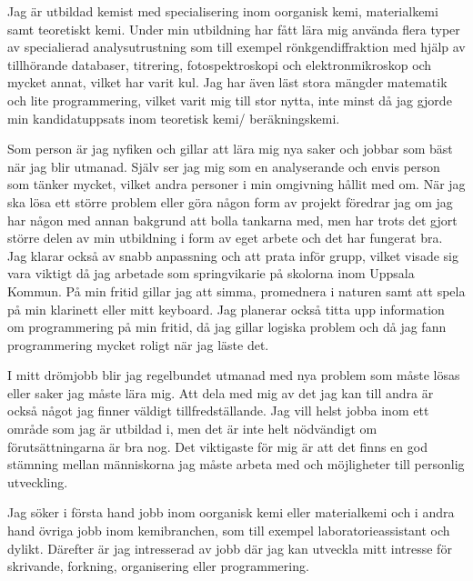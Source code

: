 Jag är utbildad kemist med specialisering inom oorganisk kemi, materialkemi samt teoretiskt kemi. Under min utbildning har  fått lära mig använda flera typer av specialierad analysutrustning som till exempel rönkgendiffraktion med hjälp av tillhörande databaser, titrering, fotospektroskopi och elektronmikroskop och mycket annat, vilket har varit kul. Jag har även läst stora mängder matematik och lite programmering, vilket varit mig till stor nytta, inte minst då  jag gjorde min kandidatuppsats inom teoretisk kemi/ beräkningskemi.


Som person är jag nyfiken och gillar att lära mig nya saker och jobbar som bäst när jag blir utmanad. Själv ser jag mig som en analyserande och envis person som tänker mycket, vilket andra personer i min omgivning hållit med om. När jag ska lösa ett större  problem eller göra någon form av projekt föredrar jag om jag  har någon med annan bakgrund att bolla tankarna med, men har trots det gjort större delen av min utbildning i form av eget arbete och det har fungerat bra. Jag klarar också av snabb anpassning och att prata inför grupp, vilket visade sig vara viktigt då jag arbetade som springvikarie på skolorna inom Uppsala Kommun. På min fritid gillar jag att simma, promednera i naturen samt att spela på min klarinett eller mitt keyboard. Jag planerar också titta upp information om programmering på min fritid, då jag gillar logiska problem och då jag fann programmering mycket roligt när jag läste det.

I mitt drömjobb blir jag regelbundet utmanad med nya problem som måste lösas eller saker jag måste lära mig. Att dela med mig av det jag kan till andra är också något jag finner väldigt tillfredställande. Jag vill helst jobba inom ett område som jag är utbildad i, men det är inte helt nödvändigt om förutsättningarna är bra nog. Det viktigaste för mig är att det finns en god stämning mellan människorna jag måste arbeta med och möjligheter till personlig utveckling.

Jag söker i första hand jobb inom oorganisk kemi eller materialkemi och i andra hand övriga jobb inom kemibranchen, som till exempel laboratorieassistant och dylikt. Därefter är jag intresserad av jobb där jag kan utveckla mitt intresse för skrivande, forkning,  organisering eller programmering.